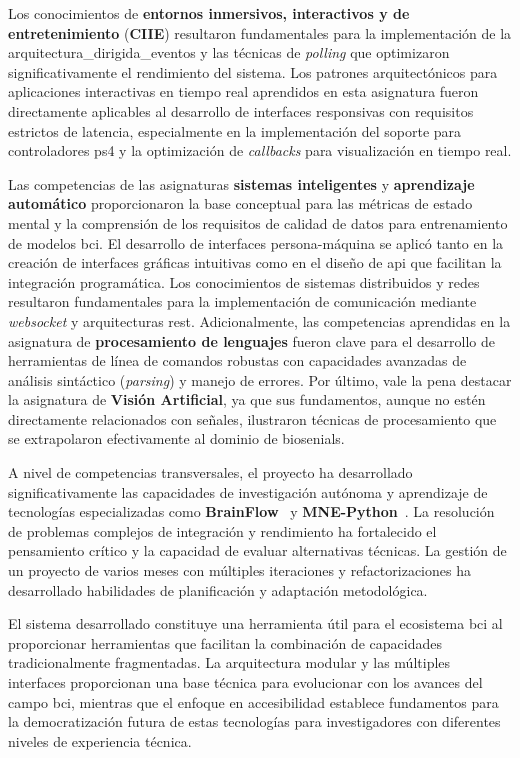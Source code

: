 Los conocimientos de \textbf{entornos inmersivos, interactivos y de entretenimiento} (\textbf{CIIE}) resultaron fundamentales para la implementación de la \gls{arquitectura_dirigida_eventos} y las técnicas de \textit{\gls{polling}} que optimizaron significativamente el rendimiento del sistema. Los patrones arquitectónicos para aplicaciones interactivas en tiempo real aprendidos en esta asignatura fueron directamente aplicables al desarrollo de interfaces responsivas con requisitos estrictos de latencia, especialmente en la implementación del soporte para controladores \acrshort{ps4} y la optimización de \textit{\glspl{callback}} para visualización en tiempo real.

Las competencias de las asignaturas \textbf{sistemas inteligentes} y \textbf{aprendizaje automático} proporcionaron la base conceptual para las métricas de estado mental y la comprensión de los requisitos de calidad de datos para entrenamiento de modelos \acrshort{bci}. El desarrollo de interfaces persona-máquina se aplicó tanto en la creación de interfaces gráficas intuitivas como en el diseño de \acrshort{api} que facilitan la integración programática. Los conocimientos de sistemas distribuidos y redes resultaron fundamentales para la implementación de comunicación mediante \textit{\gls{websocket}} y arquitecturas \acrshort{rest}. Adicionalmente, las competencias aprendidas en la asignatura de \textbf{procesamiento de lenguajes} fueron clave para el desarrollo de herramientas de línea de comandos robustas con capacidades avanzadas de análisis sintáctico (\textit{parsing}) y manejo de errores. Por último, vale la pena destacar la asignatura de \textbf{Visión Artificial}, ya que sus fundamentos, aunque no estén directamente relacionados con señales, ilustraron técnicas de procesamiento que se extrapolaron efectivamente al dominio de \glspl{biosenial}.

A nivel de competencias transversales, el proyecto ha desarrollado significativamente las capacidades de investigación autónoma y aprendizaje de tecnologías especializadas como \textbf{BrainFlow}~\cite{brainflow} y \textbf{MNE-Python}~\cite{gramfort2013meg}. La resolución de problemas complejos de integración y rendimiento ha fortalecido el pensamiento crítico y la capacidad de evaluar alternativas técnicas. La gestión de un proyecto de varios meses con múltiples iteraciones y refactorizaciones ha desarrollado habilidades de planificación y adaptación metodológica.

El sistema desarrollado constituye una herramienta útil para el ecosistema \acrshort{bci} al proporcionar herramientas que facilitan la combinación de capacidades tradicionalmente fragmentadas. La arquitectura modular y las múltiples interfaces proporcionan una base técnica para evolucionar con los avances del campo \acrshort{bci}, mientras que el enfoque en accesibilidad establece fundamentos para la democratización futura de estas tecnologías para investigadores con diferentes niveles de experiencia técnica.

